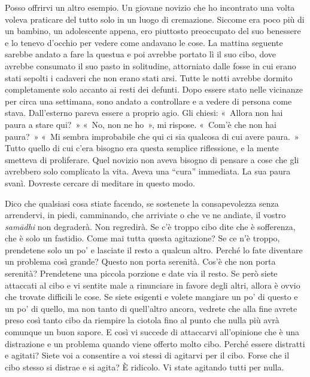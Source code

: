 Posso offrirvi un altro esempio. Un giovane novizio che ho incontrato
una volta voleva praticare del tutto solo in un luogo di cremazione.
Siccome era poco più di un bambino, un adolescente appena, ero piuttosto
preoccupato del suo benessere e lo tenevo d'occhio per vedere come
andavano le cose. La mattina seguente sarebbe andato a fare la questua e
poi avrebbe portato lì il suo cibo, dove avrebbe consumato il suo pasto
in solitudine, attorniato dalle fosse in cui erano stati sepolti i
cadaveri che non erano stati arsi. Tutte le notti avrebbe dormito
completamente solo accanto ai resti dei defunti. Dopo essere stato nelle
vicinanze per circa una settimana, sono andato a controllare e a vedere
di persona come stava. Dall'esterno pareva essere a proprio agio. Gli
chiesi: «~Allora non hai paura a stare qui?~» «~No, non ne ho~», mi
rispose. «~Com'è che non hai paura?~» «~Mi sembra improbabile che qui ci
sia qualcosa di cui avere paura.~» Tutto quello di cui c'era bisogno era
questa semplice riflessione, e la mente smetteva di proliferare. Quel
novizio non aveva bisogno di pensare a cose che gli avrebbero solo
complicato la vita. Aveva una ``cura'' immediata. La sua paura svanì.
Dovreste cercare di meditare in questo modo.

Dico che qualsiasi cosa stiate facendo, se sostenete la consapevolezza
senza arrendervi, in piedi, camminando, che arriviate o che ve ne
andiate, il vostro \emph{samādhi} non degraderà. Non regredirà. Se c'è
troppo cibo dite che è sofferenza, che è solo un fastidio. Come mai
tutta questa agitazione? Se ce n'è troppo, prendetene solo un po' e
lasciate il resto a qualcun altro. Perché lo fate diventare un problema
così grande? Questo non porta serenità. Cos'è che non porta serenità?
Prendetene una piccola porzione e date via il resto. Se però siete
attaccati al cibo e vi sentite male a rinunciare in favore degli altri,
allora è ovvio che trovate difficili le cose. Se siete esigenti e volete
mangiare un po' di questo e un po' di quello, ma non tanto di
quell'altro ancora, vedrete che alla fine avrete preso così tanto cibo
da riempire la ciotola fino al punto che nulla più avrà comunque un buon
sapore. E così vi succede di attaccarvi all'opinione che è una
distrazione e un problema quando viene offerto molto cibo. Perché essere
distratti e agitati? Siete voi a consentire a voi stessi di agitarvi per
il cibo. Forse che il cibo stesso si distrae e si agita? È ridicolo. Vi
state agitando tutti per nulla.

